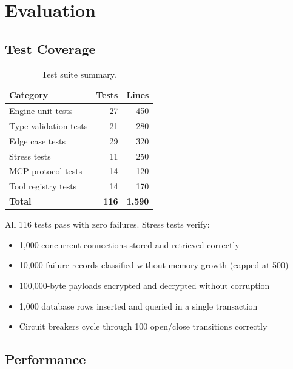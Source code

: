 \documentclass[10pt,twocolumn]{article}
\begin{document}
\section{Evaluation}

\subsection{Test Coverage}

\begin{table}[h]
\centering
\caption{Test suite summary.}
\label{tab:tests}
\begin{tabular}{@{}lrr@{}}
\toprule
\textbf{Category} & \textbf{Tests} & \textbf{Lines} \\
\midrule
Engine unit tests & 27 & 450 \\
Type validation tests & 21 & 280 \\
Edge case tests & 29 & 320 \\
Stress tests & 11 & 250 \\
MCP protocol tests & 14 & 120 \\
Tool registry tests & 14 & 170 \\
\midrule
\textbf{Total} & \textbf{116} & \textbf{1,590} \\
\bottomrule
\end{tabular}
\end{table}

All 116 tests pass with zero failures. Stress tests verify:
\begin{itemize}
    \item 1,000 concurrent connections stored and retrieved correctly
    \item 10,000 failure records classified without memory growth (capped at 500)
    \item 100,000-byte payloads encrypted and decrypted without corruption
    \item 1,000 database rows inserted and queried in a single transaction
    \item Circuit breakers cycle through 100 open/close transitions correctly
\end{itemize}

\subsection{Performance}
\end{document}
